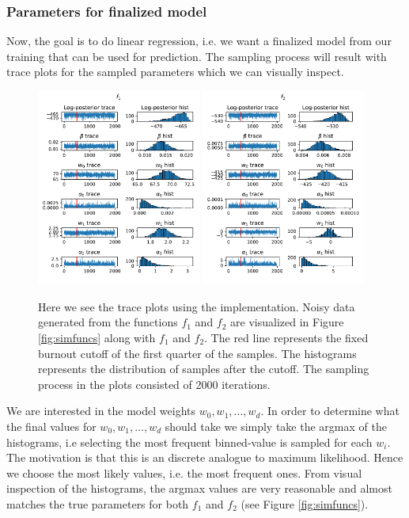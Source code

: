 \documentclass[12pt]{article}
\begin{document}
        \subsubsection{Parameters for finalized model} \label{seq:determine}
            Now, the goal is to do linear regression, i.e. we want a finalized model from our training that can be used for prediction. The sampling process will result with trace plots for the sampled parameters which we can visually inspect.
            \begin{figure}[H]
                \centering
                \includegraphics[width=0.48\textwidth]{f_1_noise0_tplot_ard.pdf}
                \includegraphics[width=0.48\textwidth]{f_2_noise0_tplot_ard.pdf}
                \caption{Here we see the trace plots using the implementation. Noisy data generated from the functions $f_1$ and $f_2$ are visualized in Figure \ref{fig:simfuncs} along with $f_1$ and $f_2$. The red line represents the fixed burnout cutoff of the first quarter of the samples. The histograms represents the distribution of samples after the cutoff. The sampling process in the plots consisted of 2000 iterations.}
            \end{figure}
            We are interested in the model weights $w_0, w_1, \ldots, w_d$. In order to determine what the final values for $w_0, w_1, \ldots, w_d$ should take we simply take the argmax of the histograms, i.e selecting the most frequent binned-value is sampled for each $w_i$. The motivation is that this is an discrete analogue to maximum likelihood. Hence we choose the most likely values, i.e. the most frequent ones. From visual inspection of the histograms, the argmax values are very reasonable and almost matches the true parameters for both $f_1$ and $f_2$ (see Figure \ref{fig:simfuncs}).
\end{document}
